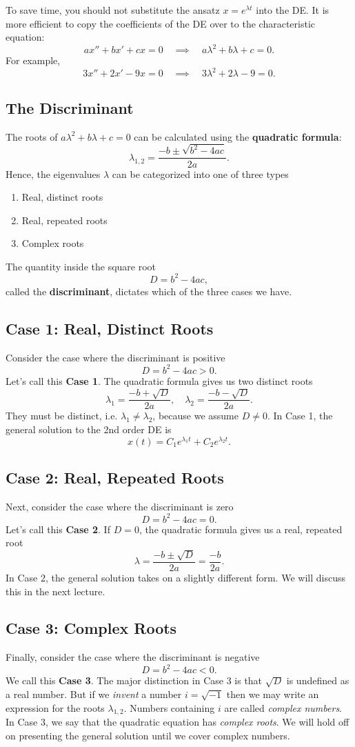 \documentclass[10pt,letterpaper]{article}
\begin{document}
To save time, you should not substitute the ansatz $x=e^{\lambda t}$ into the DE. It is more efficient to copy the coefficients of the DE over to the characteristic equation:
\[
\boxed{
ax''+bx'+cx=0
\quad\implies\quad
a\lambda^2+b\lambda+c=0.
}
\]
For example, 
$$
3x''+2x'-9x=0
\quad\implies\quad
3\lambda^2+2\lambda-9=0.
$$


\subsection{The Discriminant}
The roots of $a\lambda^2+b\lambda+c=0$ can be calculated using the \textbf{quadratic formula}: 
$$
\lambda_{1,2} = \frac{-b\pm \sqrt{b^2-4ac}}{2a}.
$$
Hence, the eigenvalues $\lambda$ can be categorized into one of three types
\begin{enumerate}
    \item Real, distinct roots 
    \item Real, repeated roots
    \item Complex roots
\end{enumerate}
The quantity inside the square root 
$$D = b^2-4ac,$$ called the \textbf{discriminant}, dictates which of the three cases we have. 

\subsection*{Case 1: Real, Distinct Roots}
Consider the case where the discriminant is positive
$$D=b^2-4ac>0.$$
Let's call this \textbf{Case 1}. The quadratic formula gives us two distinct roots
$$
\lambda_1 = \frac{-b+\sqrt{D}}{2a}, \quad \lambda_2=\frac{-b-\sqrt{D}}{2a}.
$$
They must be distinct, i.e. $\lambda_1\neq\lambda_2$, because we assume $D\ne0$. In Case 1, the general solution to the 2nd order DE is
\[
x(t)=C_1 e^{\lambda_1 t}+C_2 e^{\lambda_2 t}.
\]


\subsection*{Case 2: Real, Repeated Roots}
Next, consider the case where the discriminant is zero
$$D=b^2-4ac=0.$$
Let's call this \textbf{Case 2}. If $D=0$, the quadratic formula gives us a real, repeated root
$$
\lambda = \frac{-b\pm\sqrt{D}}{2a}=\frac{-b}{2a}.
$$
In Case 2, the general solution takes on a slightly different form. We will discuss this in the next lecture.


\subsection*{Case 3: Complex Roots}
Finally, consider the case where the discriminant is negative
$$D=b^2-4ac<0.$$
We call this \textbf{Case 3}. The major distinction in Case 3 is that $\sqrt{D}$ is undefined as a real number. But if we \textit{invent} a number
$i= \sqrt{-1}$ then we may write an expression for the roots $\lambda_{1,2}$. 
Numbers containing $i$ are called \textit{complex numbers}. In Case 3, we say that the quadratic equation has \textit{complex roots}. We will hold off on presenting the general solution until we cover complex numbers.
\end{document}
